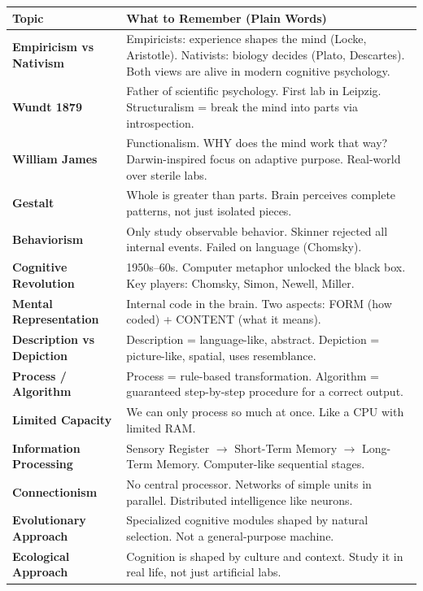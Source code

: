 \documentclass[11pt,a4paper]{article}
\newcommand{\bb}[1]{\textbf{#1}}
\begin{document}
\begin{center}
\renewcommand{\arraystretch}{1.4}
\begin{tabular}{|L{3cm}|L{12.2cm}|}
\hline
{}\color{white}\bb{Topic} & \color{white}\bb{What to Remember (Plain Words)} \\
\hline
\bb{Empiricism vs Nativism} & Empiricists: experience shapes the mind (Locke, Aristotle). Nativists: biology decides (Plato, Descartes). Both views are alive in modern cognitive psychology. \\
\bb{Wundt 1879} & Father of scientific psychology. First lab in Leipzig. Structuralism = break the mind into parts via introspection. \\
\bb{William James} & Functionalism. WHY does the mind work that way? Darwin-inspired focus on adaptive purpose. Real-world over sterile labs. \\
\bb{Gestalt} & Whole is greater than parts. Brain perceives complete patterns, not just isolated pieces. \\
\bb{Behaviorism} & Only study observable behavior. Skinner rejected all internal events. Failed on language (Chomsky). \\
\bb{Cognitive Revolution} & 1950s--60s. Computer metaphor unlocked the black box. Key players: Chomsky, Simon, Newell, Miller. \\
\bb{Mental Representation} & Internal code in the brain. Two aspects: FORM (how coded) + CONTENT (what it means). \\
\bb{Description vs Depiction} & Description = language-like, abstract. Depiction = picture-like, spatial, uses resemblance. \\
\bb{Process / Algorithm} & Process = rule-based transformation. Algorithm = guaranteed step-by-step procedure for a correct output. \\
\bb{Limited Capacity} & We can only process so much at once. Like a CPU with limited RAM. \\
\bb{Information Processing} & Sensory Register $\to$ Short-Term Memory $\to$ Long-Term Memory. Computer-like sequential stages. \\
\bb{Connectionism} & No central processor. Networks of simple units in parallel. Distributed intelligence like neurons. \\
\bb{Evolutionary Approach} & Specialized cognitive modules shaped by natural selection. Not a general-purpose machine. \\
\bb{Ecological Approach} & Cognition is shaped by culture and context. Study it in real life, not just artificial labs. \\

\end{tabular}
\end{center}
\end{document}
